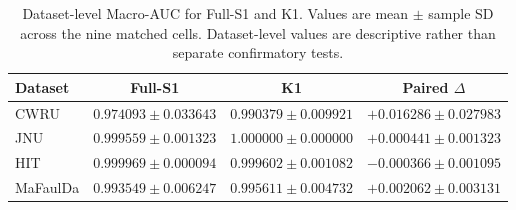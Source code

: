 \begin{table}[t]
\centering
\caption{Dataset-level Macro-AUC for Full-S1 and K1. Values are mean $\pm$ sample SD across the nine matched cells. Dataset-level values are descriptive rather than separate confirmatory tests.}
\label{tab:dataset_results_auc}
\small
\begin{tabular}{lccc}
\toprule
Dataset & Full-S1 & K1 & Paired $\Delta$ \\
\midrule
CWRU & $0.974093 \pm 0.033643$ & $0.990379 \pm 0.009921$ & $+0.016286 \pm 0.027983$ \\
JNU & $0.999559 \pm 0.001323$ & $1.000000 \pm 0.000000$ & $+0.000441 \pm 0.001323$ \\
HIT & $0.999969 \pm 0.000094$ & $0.999602 \pm 0.001082$ & $-0.000366 \pm 0.001095$ \\
MaFaulDa & $0.993549 \pm 0.006247$ & $0.995611 \pm 0.004732$ & $+0.002062 \pm 0.003131$ \\
\bottomrule
\end{tabular}
\end{table}
